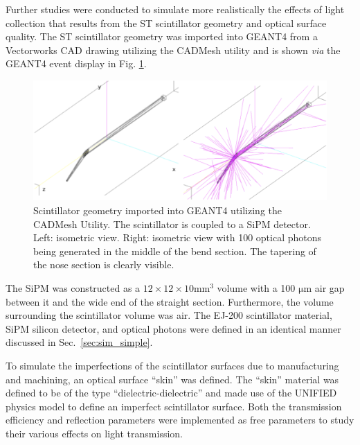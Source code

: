 Further studies were conducted to simulate more realistically the effects of light collection that results from the ST scintillator geometry and optical surface quality.  The ST scintillator geometry was imported into GEANT4 from a Vectorworks CAD drawing utilizing the CADMesh utility \cite{cadmesh_g4} and is shown \textit{via} the GEANT4 event display in Fig. \ref{fig:pk_cadmesh}.
	\begin{figure}[!htb]
	\centering
	\includegraphics[width=1.0\columnwidth]{simulation/figs/pk_cadmesh_v2}
	\caption{Scintillator geometry imported into GEANT4 utilizing the CADMesh Utility.  The scintillator is  coupled to a SiPM detector.  Left: isometric view.  Right: isometric view with 100 optical photons being generated in the middle of the bend section.  The tapering of the nose section is clearly visible.}
	\label{fig:pk_cadmesh}
	\end{figure}
The SiPM was constructed as a $12 \times 12 \times 10 \mathrm{mm^{3}}$ volume with a 100 $\mathrm{\mu m}$ air gap between it and the wide end of the straight section.  Furthermore, the volume surrounding the scintillator volume was air.  The EJ-200 scintillator material, SiPM silicon detector, and optical photons were defined in an identical manner discussed in Sec.~\ref{sec:sim_simple}.

To simulate the imperfections of the scintillator surfaces due to manufacturing and machining, an optical surface ``skin'' was defined.  The ``skin'' material was defined to be of the type ``dielectric-dielectric'' and made use of the UNIFIED physics model \cite{scint_surface_sim} to define an imperfect scintillator surface.  Both the transmission efficiency and reflection parameters were implemented as free parameters to study their various effects on light transmission.

